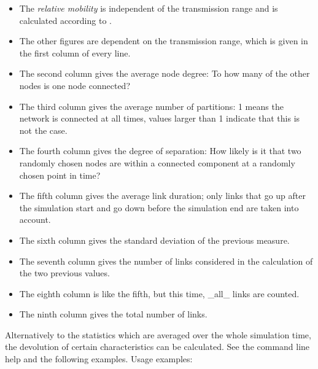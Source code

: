 \documentclass[11pt,a4paper,twoside,normalheadings,headsepline,DIV13,BCOR11mm,openright]{article}
\begin{document}
\begin{itemize}
\item The  \emph{relative mobility} is independent of the transmission range and
   is calculated according to \cite{johansson_scenario_based_1999}.

\item The  other  figures are dependent on the transmission range, which is
   given in the first column of every line.

\item The second column gives the average node degree: To how many  of  the
   other nodes is one node connected?

\item The  third column gives the average number of partitions: 1 means the
   network is connected at all times, values larger than 1 indicate that
   this is not the case.

\item The  fourth  column  gives the degree of separation: How likely is it
   that two randomly chosen nodes are within a connected component at  a
   randomly chosen point in time?

\item The  fifth column gives the average link duration; only links that go
   up after the simulation start and go down before the  simulation  end
   are taken into account.

\item The  sixth  column  gives  the  standard  deviation  of  the previous
   measure.

\item The seventh column gives  the  number  of  links  considered  in  the
   calculation of the two previous values.

\item The  eighth  column is like the fifth, but this time, \_all\_ links are
   counted.

\item The ninth column gives the total number of links.
\end{itemize}

Alternatively to the  statistics  which  are  averaged  over  the  whole
simulation  time,  the  devolution  of  certain  characteristics  can be
calculated. See the command line help and the following examples.
\newline \newline
Usage examples:
\newline
\end{document}

